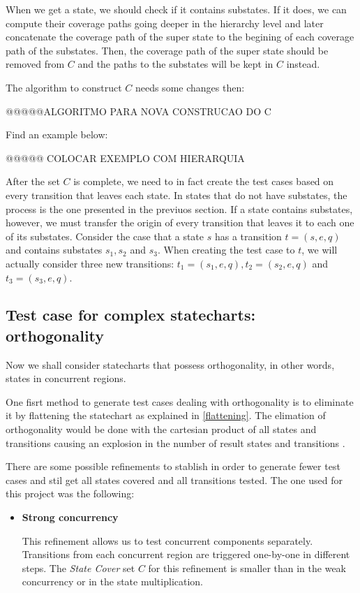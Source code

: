 When we get a state, we should check if it contains substates. If it does, we can compute their coverage paths going deeper in the hierarchy level and later concatenate the coverage path of the super state to the begining of each coverage path of the substates. Then, the coverage path of the super state should be removed from $C$ and the paths to the substates will be kept in $C$ instead.

The algorithm to construct $C$ needs some changes then:

@@@@@ALGORITMO PARA NOVA CONSTRUCAO DO C 

Find an example below:

@@@@@ COLOCAR EXEMPLO COM HIERARQUIA

After the set $C$ is complete, we need to in fact create the test cases based on every transition that leaves each state. In states that do not have substates, the process is the one presented in the previuos section. If a state contains substates, however, we must transfer the origin of every transition that leaves it to each one of its substates. Consider the case that a state $s$ has a transition $t = (s,e,q)$ and contains substates $s_1, s_2$ and $s_3$. When creating the test case to $t$, we will actually consider three new transitions: $t_1 = (s_1,e,q), t_2 = (s_2,e,q)$ and $t_3 = (s_3,e,q)$. 

\subsection{Test case for complex statecharts: orthogonality}

Now we shall consider statecharts that possess orthogonality, in other words, states in concurrent regions.

One fisrt method to generate test cases dealing with orthogonality is to eliminate it by flattening the statechart as explained in \ref{flattening}. The elimation of orthogonality would be done with the cartesian product of all states and transitions causing an explosion in the number of result states and transitions \cite{bogdanov}.

There are some possible refinements to stablish in order to generate fewer test cases and stil get all states covered and all transitions tested. The one used for this project was the following:

\begin{itemize}

\item \textbf{Strong concurrency}

This refinement allows us to test concurrent components separately. Transitions from each concurrent region are triggered one-by-one in different steps.
The \textit{State Cover} set $C$ for this refinement is smaller than in the weak concurrency or in the state multiplication.
\end{itemize}

